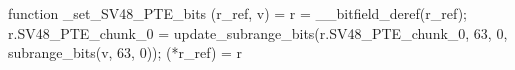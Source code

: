 function _set_SV48_PTE_bits (r_ref, v) = {
    r = __bitfield_deref(r_ref);
    r.SV48_PTE_chunk_0 = update_subrange_bits(r.SV48_PTE_chunk_0, 63, 0, subrange_bits(v, 63, 0));
    (*r_ref) = r
}
